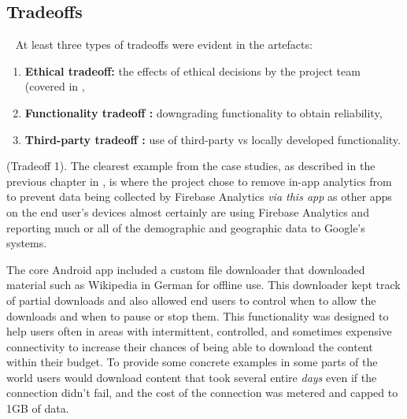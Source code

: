 \subsection{Tradeoffs}~\label{aata-tradeoffs-topic}
At least three types of tradeoffs were evident in the artefacts: 
\begin{enumerate}
    \item \textbf{Ethical tradeoff: } the effects of ethical decisions by the project team (covered in ,
    \item \textbf{Functionality tradeoff :} downgrading functionality to obtain reliability,
    \item \textbf{Third-party tradeoff :} use of third-party vs locally developed functionality.
\end{enumerate}

 (Tradeoff 1).
The clearest example from the case studies, as described in the previous chapter in , is where the  project chose to remove in-app analytics from  to prevent data being collected by Firebase Analytics \emph{via this app} as other apps on the end user's devices almost certainly are using Firebase Analytics and reporting much or all of the demographic and geographic data to Google's systems.

The core  Android app included a custom file downloader that downloaded material such as Wikipedia in German for offline use. This downloader kept track of partial downloads and also allowed end users to control when to allow the downloads and when to pause or stop them. This functionality was designed to help users often in areas with intermittent, controlled, and sometimes expensive connectivity to increase their chances of being able to download the content within their budget. To provide some concrete examples in some parts of the world users would download content that took several entire \emph{days} even if the connection didn't fail, and the cost of the connection was metered and capped to 1GB of data.

